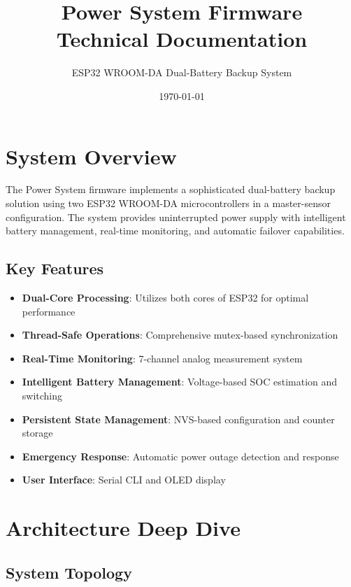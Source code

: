 \documentclass[11pt,a4paper]{article}
\title{\Huge\textbf{Power System Firmware}\\\Large Technical Documentation}
\author{ESP32 WROOM-DA Dual-Battery Backup System}
\date{\today}
\begin{document}
\maketitle
\newpage

\tableofcontents
\newpage

\section{System Overview}

The Power System firmware implements a sophisticated dual-battery backup solution using two ESP32 WROOM-DA microcontrollers in a master-sensor configuration. The system provides uninterrupted power supply with intelligent battery management, real-time monitoring, and automatic failover capabilities.

\subsection{Key Features}
\begin{itemize}
    \item \textbf{Dual-Core Processing}: Utilizes both cores of ESP32 for optimal performance
    \item \textbf{Thread-Safe Operations}: Comprehensive mutex-based synchronization
    \item \textbf{Real-Time Monitoring}: 7-channel analog measurement system
    \item \textbf{Intelligent Battery Management}: Voltage-based SOC estimation and switching
    \item \textbf{Persistent State Management}: NVS-based configuration and counter storage
    \item \textbf{Emergency Response}: Automatic power outage detection and response
    \item \textbf{User Interface}: Serial CLI and OLED display
\end{itemize}

\section{Architecture Deep Dive}

\subsection{System Topology}
\end{document}
